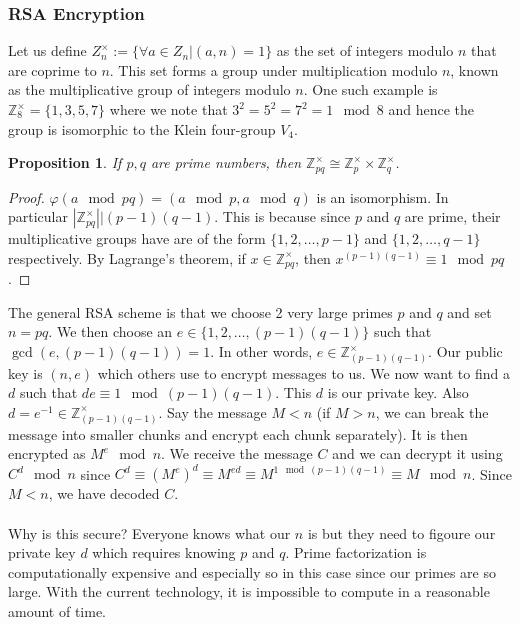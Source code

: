 \documentclass{article}
\newcommand{\Z}{\mathbb{Z}}
\newtheorem{proposition}[theorem]{Proposition}
\theoremstyle{definition}
\begin{document}
\subsubsection{RSA Encryption}
Let us define $Z_n^\times := \{ \forall a \in Z_n | (a,n)=1\}$ as the set of integers modulo $n$ that are coprime to $n$. This set forms a group under multiplication modulo $n$, known as the multiplicative group of integers modulo $n$. One such example is $\Z_8^\times = \{1, 3, 5, 7\}$ where we note that $3^2 = 5^2 = 7^2 = 1 \mod{8}$ and hence the group is isomorphic to the Klein four-group $V_4$.
\begin{proposition}
    If $p,q$ are prime numbers, then $\Z_{pq}^\times \cong \Z_p^\times \times \Z_q^\times$.
\end{proposition}
\begin{proof}
    $\varphi (a\mod pq) = (a\mod p, a\mod q)$ is an isomorphism. In particular $|\Z_{pq}^\times| \big| (p-1)(q-1)$. This is because since $p$ and $q$ are prime, their multiplicative groups have are of the form $\{1,2,\ldots,p-1\}$ and $\{1,2,\ldots,q-1\}$ respectively. By Lagrange's theorem, if $x\in \Z_{pq}^\times$, then $x^{(p-1)(q-1)} \equiv 1 \mod{pq}$.
\end{proof}
The general RSA scheme is that we choose 2 very large primes $p$ and $q$ and set $n=pq$. We then choose an $e\in \{1,2,\ldots, (p-1)(q-1)\}$ such that $\gcd(e, (p-1)(q-1)) = 1$. In other words, $e \in \Z_{(p-1)(q-1)}^\times$. Our public key is $(n,e)$ which others use to encrypt messages to us. We now want to find a $d$ such that $de \equiv 1 \mod{(p-1)(q-1)}$. This $d$ is our private key. Also $d = e^{-1} \in \Z_{(p-1)(q-1)}^\times$. Say the message $M <n$ (if $M>n$, we can break the message into smaller chunks and encrypt each chunk separately). It is then encrypted as $M^e \mod {n}$. We receive the message $C$ and we can decrypt it using $C^d \mod n$ since $C^d \equiv (M^e)^d \equiv M^{ed} \equiv M^{1\mod (p-1)(q-1)}\equiv M \mod n$. Since $M<n$, we have decoded $C$. \\\\
Why is this secure? Everyone knows what our $n$ is but they need to figoure our private key $d$ which requires knowing $p$ and $q$. Prime factorization is computationally expensive and especially so in this case since our primes are so large. With the current technology, it is impossible to compute in a reasonable amount of time.
\end{document}
